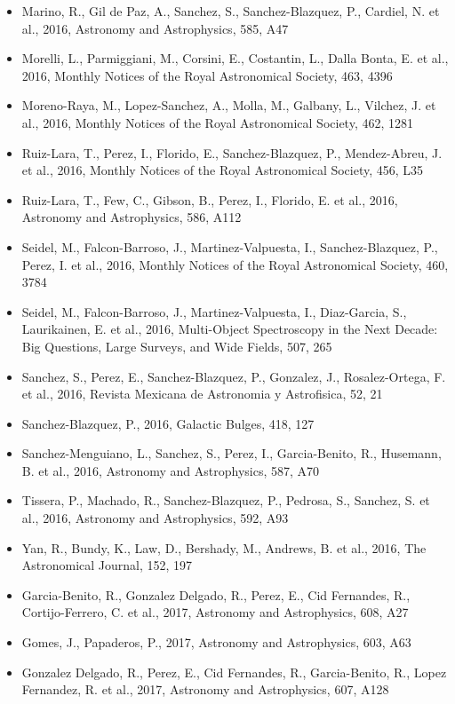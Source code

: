 \documentclass{letter}
\begin{document}
\begin{enumerate}
\begin{itemize}
\item Marino, R., Gil de Paz, A., Sanchez, S., Sanchez-Blazquez, P., Cardiel, N. et al., 2016, Astronomy and Astrophysics, 585, A47
\item Morelli, L., Parmiggiani, M., Corsini, E., Costantin, L., Dalla Bonta, E. et al., 2016, Monthly Notices of the Royal Astronomical Society, 463, 4396
\item Moreno-Raya, M., Lopez-Sanchez, A., Molla, M., Galbany, L., Vilchez, J. et al., 2016, Monthly Notices of the Royal Astronomical Society, 462, 1281
\item Ruiz-Lara, T., Perez, I., Florido, E., Sanchez-Blazquez, P., Mendez-Abreu, J. et al., 2016, Monthly Notices of the Royal Astronomical Society, 456, L35
\item Ruiz-Lara, T., Few, C., Gibson, B., Perez, I., Florido, E. et al., 2016, Astronomy and Astrophysics, 586, A112
\item Seidel, M., Falcon-Barroso, J., Martinez-Valpuesta, I., Sanchez-Blazquez, P., Perez, I. et al., 2016, Monthly Notices of the Royal Astronomical Society, 460, 3784
\item Seidel, M., Falcon-Barroso, J., Martinez-Valpuesta, I., Diaz-Garcia, S., Laurikainen, E. et al., 2016, Multi-Object Spectroscopy in the Next Decade: Big Questions, Large Surveys, and Wide Fields, 507, 265
\item Sanchez, S., Perez, E., Sanchez-Blazquez, P., Gonzalez, J., Rosalez-Ortega, F. et al., 2016, Revista Mexicana de Astronomia y Astrofisica, 52, 21
\item Sanchez-Blazquez, P., 2016, Galactic Bulges, 418, 127
\item Sanchez-Menguiano, L., Sanchez, S., Perez, I., Garcia-Benito, R., Husemann, B. et al., 2016, Astronomy and Astrophysics, 587, A70
\item Tissera, P., Machado, R., Sanchez-Blazquez, P., Pedrosa, S., Sanchez, S. et al., 2016, Astronomy and Astrophysics, 592, A93
\item Yan, R., Bundy, K., Law, D., Bershady, M., Andrews, B. et al., 2016, The Astronomical Journal, 152, 197
\item Garcia-Benito, R., Gonzalez Delgado, R., Perez, E., Cid Fernandes, R., Cortijo-Ferrero, C. et al., 2017, Astronomy and Astrophysics, 608, A27
\item Gomes, J., Papaderos, P., 2017, Astronomy and Astrophysics, 603, A63
\item Gonzalez Delgado, R., Perez, E., Cid Fernandes, R., Garcia-Benito, R., Lopez Fernandez, R. et al., 2017, Astronomy and Astrophysics, 607, A128

\end{itemize}
\end{enumerate}
\end{document}
